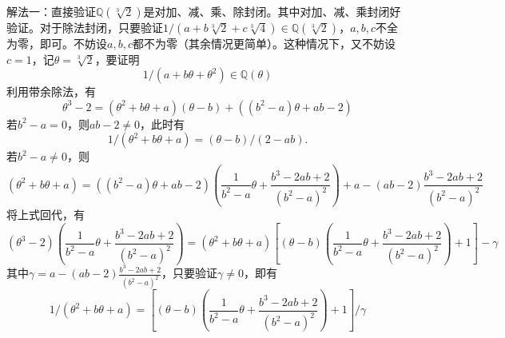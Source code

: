 解法一：直接验证$\mathbb{Q}(\sqrt[3]{2})$是对加、减、乘、除封闭。其中对加、减、乘封闭好验证。对于除法封闭，只要验证$1/(a + b\sqrt[3]{2} + c\sqrt[3]{4}) \in \mathbb{Q}(\sqrt[3]{2})$，$a,b,c$不全为零，即可。不妨设$a,b,c$都不为零（其余情况更简单）。这种情况下，又不妨设$c=1$，记$\theta = \sqrt[3]{2}$，要证明
$$1/(a + b\theta + \theta^2) \in \mathbb{Q}(\theta)$$
利用带余除法，有
$$\theta^3-2 = (\theta^2 + b\theta + a) (\theta-b) + ((b^2-a)\theta + ab-2)$$
若$b^2-a=0$，则$ab-2\neq 0$，此时有
$$1/(\theta^2 + b\theta + a) = (\theta-b)/(2-ab).$$
若$b^2-a\neq 0$，则
$$(\theta^2 + b\theta + a) = ((b^2-a)\theta + ab-2) \left(\frac{1}{b^2-a}\theta + \frac{b^3 - 2ab + 2}{(b^2-a)^2} \right) + a - (ab-2)\frac{b^3 - 2ab + 2}{(b^2-a)^2}$$
将上式回代，有
$$(\theta^3-2) \left(\frac{1}{b^2-a}\theta + \frac{b^3 - 2ab + 2}{(b^2-a)^2} \right) = (\theta^2 + b\theta + a) \left[ (\theta-b) \left(\frac{1}{b^2-a}\theta + \frac{b^3 - 2ab + 2}{(b^2-a)^2} \right) + 1 \right] - \gamma$$
其中$\gamma = a - (ab-2)\frac{b^3 - 2ab + 2}{(b^2-a)^2}$，只要验证$\gamma\neq 0$，即有
$$1/(\theta^2 + b\theta + a) = \left[ (\theta-b) \left(\frac{1}{b^2-a}\theta + \frac{b^3 - 2ab + 2}{(b^2-a)^2} \right) + 1 \right] / \gamma$$

